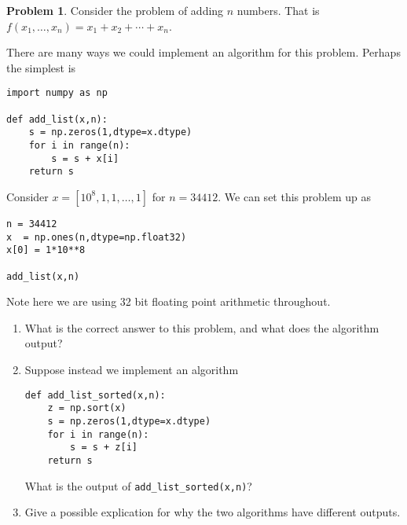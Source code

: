 \documentclass[12pt]{article}
\theoremstyle{definition}
\newtheorem{problem}{Problem}
\begin{document}
\begin{problem}
Consider the problem of adding $n$ numbers. 
That is $f(x_1, \ldots, x_n) = x_1 + x_2 + \cdots + x_n$. 

There are many ways we could implement an algorithm for this problem. Perhaps the simplest is
\begin{lstlisting}
import numpy as np

def add_list(x,n):
    s = np.zeros(1,dtype=x.dtype)
    for i in range(n):
        s = s + x[i]
    return s
\end{lstlisting}

Consider $x = [10^{8},1,1,\ldots, 1]$ for $n=34412$.
We can set this problem up as
\begin{lstlisting}
n = 34412
x  = np.ones(n,dtype=np.float32)
x[0] = 1*10**8

add_list(x,n)
\end{lstlisting}

Note here we are using 32 bit floating point arithmetic throughout. 

    \begin{enumerate}
        \item
            What is the correct answer to this problem, and what does the algorithm output?

        \item Suppose instead we implement an algorithm
\begin{lstlisting}
def add_list_sorted(x,n):
    z = np.sort(x)
    s = np.zeros(1,dtype=x.dtype)
    for i in range(n):
        s = s + z[i]
    return s
\end{lstlisting}
    What is the output of \lstinline{add_list_sorted(x,n)}?

\item Give a possible explication for why the two algorithms have different outputs.
    \end{enumerate}

\end{problem}
\end{document}
